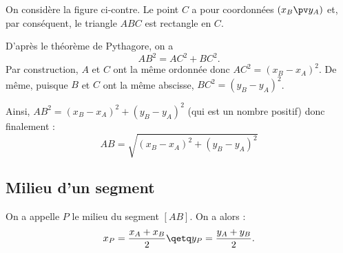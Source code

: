 \documentclass[10pt,openright,twoside,french]{book}
\begin{document}
\begin{Demo}
\begin{minipage}{0.55\linewidth}
On considère la figure ci-contre. Le point $C$ a pour coordonnées $(x_B \pv y_A)$ et, par conséquent, le triangle $ABC$ est rectangle en $C$.\par
D'après le théorème de Pythagore, on a \[AB^2 = AC^2 + BC^2.\]
Par construction, $A$ et $C$ ont la même ordonnée donc $AC^2 = (x_B - x_A)^2$. De même, puisque $B$ et $C$ ont la même abscisse, $BC^2 = (y_B - y_A)^2$.\par
Ainsi, $AB^2 = (x_B - x_A)^2 + (y_B - y_A)^2$ (qui est un nombre positif) donc finalement :
    \[AB = \sqrt{(x_B - x_A)^2 + (y_B - y_A)^2}\]
\end{minipage}\qquad
\begin{minipage}{0.4\linewidth}
\begin{center}
\end{center}
\end{minipage}

\end{Demo}

\subsection{Milieu d'un segment}
\begin{Prop}
    On a appelle $P$ le milieu du segment $[AB]$. On a alors :
    \[x_P = \frac{x_A + x_B}{2} \qetq y_P = \frac{y_A + y_B}{2}.\]
\end{Prop}
\end{document}
